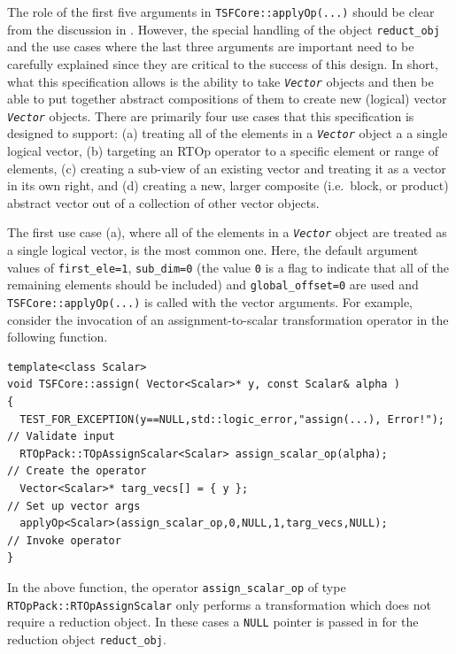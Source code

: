 The role of the first five arguments in
{}\texttt{TSFCore::applyOp(\-...)}  should be clear from the
discussion in {}\cite{ref:rtop_toms}.  However, the special handling
of the object {}\texttt{reduct\_obj} and the use cases where the last
three arguments are important need to be carefully explained since
they are critical to the success of this design.  In short, what this
specification allows is the ability to take {}\texttt{\textit{Vector}}
objects and then be able to put together abstract compositions of them
to create new (logical) vector {}\texttt{\textit{Vector}} objects.
There are primarily four use cases that this specification is designed
to support: (a) treating all of the elements in a
{}\texttt{\textit{Vector}} object a a single logical vector, (b)
targeting an RTOp operator to a specific element or range of elements,
(c) creating a sub-view of an existing vector and treating it as a
vector in its own right, and (d) creating a new, larger composite
(i.e.~block, or product) abstract vector out of a collection of other
vector objects.

The first use case (a), where all of the elements in a
{}\texttt{\textit{Vector}} object are treated as a single logical
vector, is the most common one.  Here, the default argument values of
{}\texttt{first\_ele=1}, {}\texttt{sub\_dim=0} (the value {}\texttt{0}
is a flag to indicate that all of the remaining elements should be
included) and {}\texttt{global\_offset=0} are used and
{}\texttt{TSFCore::applyOp(\-...)} is called with the vector
arguments.  For example, consider the invocation of an
assignment-to-scalar transformation operator in the following
function.

{\scriptsize\begin{verbatim}
template<class Scalar>
void TSFCore::assign( Vector<Scalar>* y, const Scalar& alpha )
{
  TEST_FOR_EXCEPTION(y==NULL,std::logic_error,"assign(...), Error!");  // Validate input
  RTOpPack::TOpAssignScalar<Scalar> assign_scalar_op(alpha);           // Create the operator
  Vector<Scalar>* targ_vecs[] = { y };                                 // Set up vector args
  applyOp<Scalar>(assign_scalar_op,0,NULL,1,targ_vecs,NULL);           // Invoke operator
}
\end{verbatim}}

{}\noindent{}In the above function, the operator
{}\texttt{assign\_scalar\_op} of type
{}\texttt{RTOpPack::RTOpAssignScalar} only performs a transformation
which does not require a reduction object.  In these cases a
{}\texttt{NULL} pointer is passed in for the reduction object
{}\texttt{reduct\_obj}.


